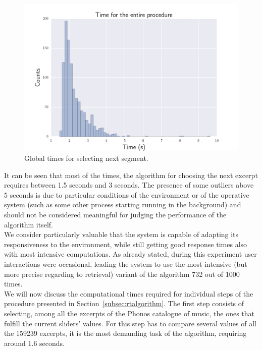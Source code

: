 \begin{figure}[h]
\begin{center}
\includegraphics[scale=0.7]{Figures/bench_procedure.pdf}
  \caption[Global times for selecting next segment]{Global times for selecting next segment.}
  \label{fig:step7}
\end{center}
\end{figure}

It can be seen that most of the times, the algorithm for choosing the next excerpt requires between 1.5 seconds and 3 seconds. The presence of some outliers above 5 seconds is due to particular conditions of the environment or of the operative system (such as some other process starting running in the background) and should not be considered meaningful for judging the performance of the algorithm itself. \\
We consider particularly valuable that the system is capable of adapting its responsiveness to the environment, while still getting good response times also with most intensive computations. As already stated, during this  experiment user interactions were occasional, leading the system to use the most intensive (but more precise regarding to retrieval) variant of the algorithm 732 out of 1000 times.\\ 
We will now discuss the computational times required for individual steps of the procedure presented in Section~\ref{subsec:rtalgorithm}. The first step consists of selecting, among all the excerpts of the Phonos catalogue of music, the ones that fulfill the current sliders' values. For this step has to compare several values of all the 159239 excerpts, it is the most demanding task of the algorithm, requiring around 1.6 seconds.

